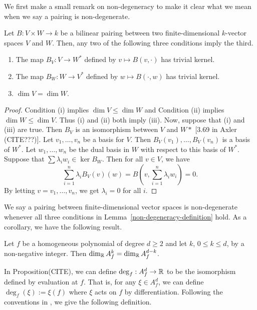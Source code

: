\documentclass{puthesis-UG}
\begin{document}
We first make a small remark on non-degeneracy to make it clear what we mean when we say a pairing is non-degenerate. 
\begin{lem} \label{non-degeneracy-definition}
	Let $B : V \times W \to k$ be a bilinear pairing between two finite-dimensional $k$-vector spaces $V$ and $W$. Then, any two of the following three conditions imply the third. 
		\begin{enumerate}[label = (\roman*)]
			\item The map $B_V : V \to W^*$ defined by $v \mapsto B(v, \cdot)$ has trivial kernel.
			\item The map $B_W : W \to V^*$ defined by $w \mapsto B(\cdot, w)$ has trivial kernel. 
			\item $\dim V = \dim W$. 
		\end{enumerate}
	\end{lem}

	\begin{proof}
		Condition (i) implies $\dim V \leq \dim W$ and Condition (ii) implies $\dim W \leq \dim V$. Thus (i) and (ii) both imply (iii). Now, suppose that (i) and (iii) are true. Then $B_V$ is an isomorphism between $V$ and $W*$ [3.69 in Axler (CITE???)]. Let $v_1, \ldots, v_n$ be a basis for $V$. Then $B_V(v_1), \ldots, B_V(v_n)$ is a basis of $W^*$. Let $w_1, \ldots, w_n$ be the dual basis in $W$ with respect to this basis of $W^*$. Suppose that $\sum \lambda_i w_i \in \ker B_W$. Then for all $v \in V$, we have 
		\[
			\sum_{i = 1}^n \lambda_i B_V(v)(w) = B \left ( v, \sum_{i = 1}^n \lambda_i w_i \right ) = 0. 
		\]
		By letting $v = v_1, \ldots, v_n$, we get $\lambda_i = 0$ for all $i$. 
	\end{proof}

We say a pairing between finite-dimensional vector spaces is non-degenerate whenever all three conditions in Lemma~\ref{non-degeneracy-definition} hold. As a corollary, we have the following result.

\begin{cor} \label{same-dimensions}
	Let $f$ be a homogeneous polynomial of degree $d \geq 2$ and let $k$, $0 \leq k \leq d$, by a non-negative integer. Then $\dim_{\mathbb{R}} A_f^k = \dim_{\mathbb{R}} A_f^{d-k}$. 
\end{cor}

In Proposition(CITE), we can define $\deg_f : A_f^d \to \mathbb{R}$ to be the isomorphism defined by evaluation at $f$. That is, for any $\xi \in A_f^d$, we can define $\deg_f (\xi) := \xi(f)$ where $\xi$ acts on $f$ by differentiation. Following the conventions in \cite{AHK}, we give the following definition. 
\end{document}
